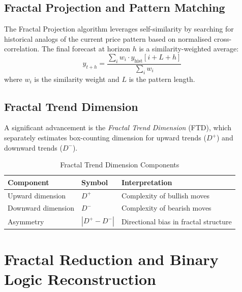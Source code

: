 \documentclass[12pt,a4paper]{article}
\begin{document}
\subsection{Fractal Projection and Pattern Matching}
\label{sec:projection}

The Fractal Projection algorithm leverages self-similarity by searching for
historical analogs of the current price pattern based on normalised
cross-correlation.  The final forecast at horizon $h$ is a
similarity-weighted average:
\begin{equation}
  \hat{y}_{t+h} =
    \frac{\sum_{i} w_i \cdot y_{\mathrm{hist}}[i+L+h]}{\sum_{i} w_i}
  \label{eq:projection}
\end{equation}
where $w_i$ is the similarity weight and $L$ is the pattern length.

\subsection{Fractal Trend Dimension}
\label{sec:ftd}

A significant advancement is the \emph{Fractal Trend Dimension} (FTD),
which separately estimates box-counting dimension for upward trends ($D^+$)
and downward trends ($D^-$).

\begin{table}[htbp]
  \centering
  \caption{Fractal Trend Dimension Components}
  \label{tab:ftd}
  \begin{tabular}{lll}
    \toprule
    \textbf{Component} & \textbf{Symbol} & \textbf{Interpretation} \\
    \midrule
    Upward dimension  & $D^+$ & Complexity of bullish moves \\
    Downward dimension & $D^-$ & Complexity of bearish moves \\
    Asymmetry & $|D^+ - D^-|$ & Directional bias in fractal structure \\
    \bottomrule
  \end{tabular}
\end{table}

\section{Fractal Reduction and Binary Logic Reconstruction}
\label{sec:reduction}
\end{document}
